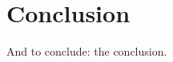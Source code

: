 \documentclass[aps,prl,twocolumn,groupedaddress]{revtex4-1}
\begin{document}
\section{Conclusion}
And to conclude: the conclusion.

\subsection{}
\subsubsection{}





%


\nocite{}
\end{document}
